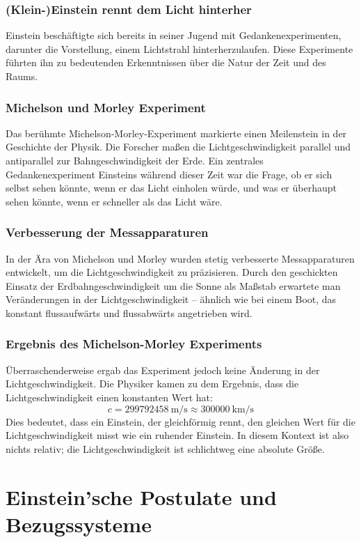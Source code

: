 \documentclass{report}
\begin{document}
\subsection{(Klein-)Einstein rennt dem Licht hinterher}
Einstein beschäftigte sich bereits in seiner Jugend mit Gedankenexperimenten, darunter die Vorstellung, einem Lichtstrahl hinterherzulaufen. Diese Experimente führten ihn zu bedeutenden Erkenntnissen über die Natur der Zeit und des Raums.
\subsection{Michelson und Morley Experiment}
Das berühmte Michelson-Morley-Experiment markierte einen Meilenstein in der Geschichte der Physik. Die Forscher maßen die Lichtgeschwindigkeit parallel und antiparallel zur Bahngeschwindigkeit der Erde. Ein zentrales Gedankenexperiment Einsteins während dieser Zeit war die Frage, ob er sich selbst sehen könnte, wenn er das Licht einholen würde, und was er überhaupt sehen könnte, wenn er schneller als das Licht wäre.
\subsection{Verbesserung der Messapparaturen}
In der Ära von Michelson und Morley wurden stetig verbesserte Messapparaturen entwickelt, um die Lichtgeschwindigkeit zu präzisieren. Durch den geschickten Einsatz der Erdbahngeschwindigkeit um die Sonne als Maßstab erwartete man Veränderungen in der Lichtgeschwindigkeit – ähnlich wie bei einem Boot, das konstant flussaufwärts und flussabwärts angetrieben wird.
\subsection{Ergebnis des Michelson-Morley Experiments}
\sloppy %
Überraschenderweise ergab das Experiment jedoch keine Änderung in der Lichtgeschwindigkeit.
Die Physiker kamen zu dem Ergebnis, dass die Lichtgeschwindigkeit einen konstanten Wert hat: 
$$c = \SI{299792458}{\meter\per\second} \approx \SI{300000}{\kilo\meter\per\second}$$
Dies bedeutet, dass ein Einstein, der gleichförmig rennt, den gleichen Wert für die Lichtgeschwindigkeit misst wie ein ruhender Einstein. 
In diesem Kontext ist also nichts relativ; die Lichtgeschwindigkeit ist schlichtweg eine absolute Größe.
\chapter{Einstein'sche Postulate und Bezugssysteme}
\end{document}
